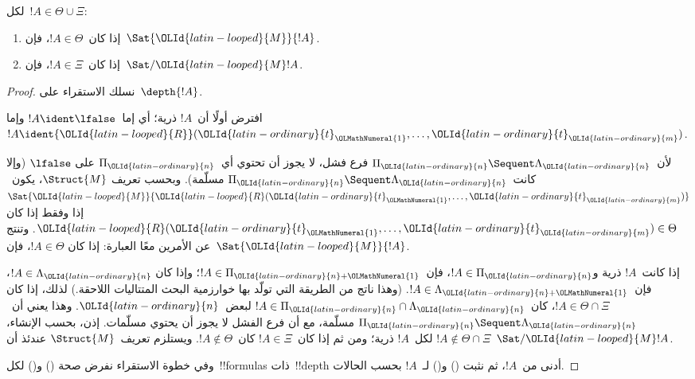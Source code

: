 \documentclass[../../../include/open-logic-section]{subfiles}
\begin{document}
\begin{lem}
لكل~$!A\in\Theta\cup\Xi$:
\begin{enumerate}
  \item إذا كان~$!A\in\Theta$، فإن~$\Sat{{\OLId{latin-looped}{M}}}{!A}$.
  \item إذا كان~$!A\in\Xi$، فإن~$\Sat/{{\OLId{latin-looped}{M}}}{!A}$.
\end{enumerate}
\end{lem}

\begin{proof}
  نسلك الاستقراء على~$\depth{!A}$.

افترض أولًا أن~$!A$ ذرية؛ أي إما~$!A\ident\lfalse$ وإما
$!A\ident {\OLId{latin-looped}{R}}({\OLId{latin-ordinary}{t}}_{\OLMathNumeral{1}},\dots,{\OLId{latin-ordinary}{t}}_{\OLId{latin-ordinary}{m}})$.

لأن~$\Pi_{\OLId{latin-ordinary}{n}} \Sequent \Lambda_{\OLId{latin-ordinary}{n}}$ فرع فشل، لا يجوز أن تحتوي أي~$\Pi_{\OLId{latin-ordinary}{n}}$ على
$\lfalse$ (وإلا كانت~$\Pi_{\OLId{latin-ordinary}{n}} \Sequent \Lambda_{\OLId{latin-ordinary}{n}}$ مسلّمة). وبحسب تعريف
$\Struct{M}$، يكون~$\Sat{{\OLId{latin-looped}{M}}}{{\OLId{latin-looped}{R}}({\OLId{latin-ordinary}{t}}_{\OLMathNumeral{1}},\dots,{\OLId{latin-ordinary}{t}}_{\OLId{latin-ordinary}{m}})}$ إذا وفقط إذا كان
${\OLId{latin-looped}{R}}({\OLId{latin-ordinary}{t}}_{\OLMathNumeral{1}},\dots,{\OLId{latin-ordinary}{t}}_{\OLId{latin-ordinary}{m}})\in\Theta$. وتنتج عن الأمرين معًا العبارة: إذا كان
$!A\in\Theta$، فإن~$\Sat{{\OLId{latin-looped}{M}}}{!A}$.

إذا كانت~$!A$ ذرية و$!A\in\Pi_{\OLId{latin-ordinary}{n}}$، فإن~$!A\in\Pi_{{\OLId{latin-ordinary}{n}}+{\OLMathNumeral{1}}}$؛ وإذا كان
$!A\in\Lambda_{\OLId{latin-ordinary}{n}}$، فإن~$!A\in\Lambda_{{\OLId{latin-ordinary}{n}}+{\OLMathNumeral{1}}}$. (وهذا ناتج من الطريقة التي
تولّد بها خوارزمية البحث المتتاليات اللاحقة.) لذلك، إذا كان
$!A\in\Theta\cap\Xi$، كان~$!A\in\Pi_{\OLId{latin-ordinary}{n}}\cap\Lambda_{\OLId{latin-ordinary}{n}}$ لبعض~${\OLId{latin-ordinary}{n}}$. وهذا يعني
أن~$\Pi_{\OLId{latin-ordinary}{n}} \Sequent \Lambda_{\OLId{latin-ordinary}{n}}$ مسلّمة، مع أن فرع الفشل لا يجوز أن يحتوي
مسلّمات. إذن، بحسب الإنشاء، $!A\notin\Theta\cap\Xi$ لكل~$!A$ ذرية؛ ومن ثم
إذا كان~$!A\in\Xi$ كان~$!A\notin\Theta$. ويستلزم تعريف~$\Struct{M}$ عندئذ
أن~$\Sat/{{\OLId{latin-looped}{M}}}{!A}$.

وفي خطوة الاستقراء نفرض صحة () و() لكل~!!{formula}s ذات~!!{depth}
أدنى من~$!A$، ثم نثبت () و() لـ~$!A$ بحسب الحالات.


\end{proof}
\end{document}
